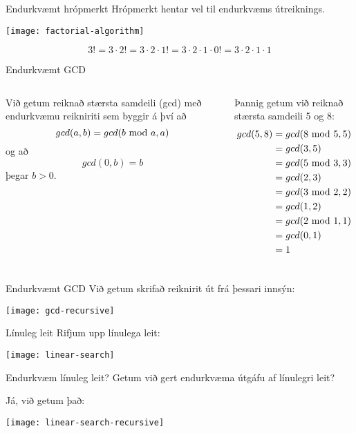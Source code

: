 \documentclass[handout]{beamer}
\begin{document}
\begin{frame}{Endurkvæmt hrópmerkt}
Hrópmerkt hentar vel til endurkvæms útreiknings.
\begin{center}
\texttt{[image: factorial-algorithm]}
\end{center}
\[
3! = 3\cdot 2! = 3 \cdot 2 \cdot 1! = 3 \cdot 2 \cdot 1 \cdot 0! = 3 \cdot 2 \cdot 1 \cdot 1
\]
\end{frame}

\begin{frame}{Endurkvæmt GCD}
\begin{columns}
Við getum reiknað stærsta samdeili (gcd) með endurkvæmu reikniriti sem byggir á því að 
\[
 gcd(a,b) = gcd(b \ \text{mod}\ a, a)
\]
og að 
\[
 gcd(0,b) = b
\]
þegar $b > 0$.

\vspace{0.5cm}
Þannig getum við reiknað stærsta samdeili 5 og 8:
\begin{align*}
gcd(5,8) &= gcd(8 \ \text{mod}\ 5, 5)\\
&= gcd(3,5)\\
&= gcd(5 \ \text{mod}\ 3, 3)\\
&= gcd(2,3)\\
&= gcd(3 \ \text{mod}\ 2, 2)\\
&= gcd(1,2)\\
&= gcd(2 \ \text{mod}\ 1, 1)\\
&= gcd(0,1)\\
&= 1
\end{align*}

\end{columns}
\end{frame}

\begin{frame}{Endurkvæmt GCD}
Við getum skrifað reiknirit út frá þessari innsýn:
\begin{center}
\texttt{[image: gcd-recursive]}
\end{center}
\end{frame}

\begin{frame}{Línuleg leit}
Rifjum upp línulega leit:
\begin{center}
\texttt{[image: linear-search]}
\end{center}
\end{frame}

\begin{frame}{Endurkvæm línuleg leit?}
Getum við gert endurkvæma útgáfu af línulegri leit?\pause

Já, við getum það:
\begin{center}
\texttt{[image: linear-search-recursive]}
\end{center}
\end{frame}
\end{document}
